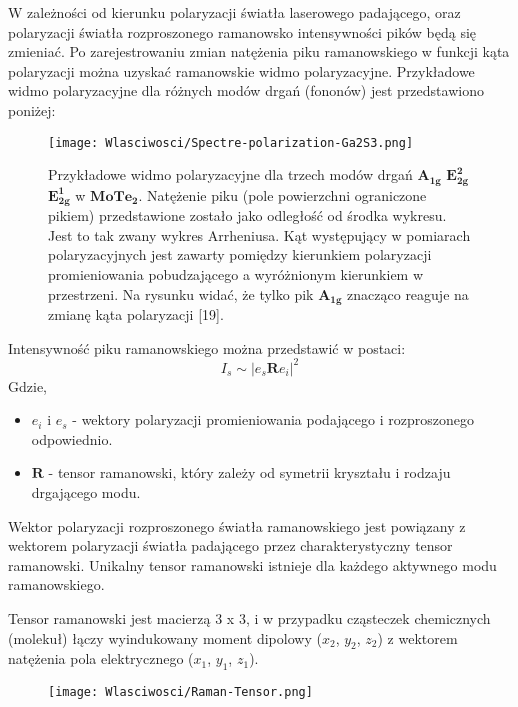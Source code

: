 W zależności od kierunku polaryzacji światła laserowego padającego, oraz polaryzacji światła rozproszonego ramanowsko intensywności pików będą się zmieniać. Po zarejestrowaniu zmian natężenia piku ramanowskiego w funkcji kąta polaryzacji można uzyskać ramanowskie widmo polaryzacyjne. Przykładowe widmo polaryzacyjne dla różnych modów drgań (fononów) jest przedstawiono poniżej:

\begin{figure}[H]
	\begin{center}
		\texttt{[image: Wlasciwosci/Spectre-polarization-Ga2S3.png]}
		\caption{Przykładowe widmo polaryzacyjne dla trzech modów drgań $\mathbf{A_{1g}}$ $\mathbf{E_{2g}^{2}}$ $\mathbf{E_{2g}^{1}}$ w $\mathbf{MoTe_{2}}$. Natężenie piku (pole powierzchni ograniczone pikiem) przedstawione zostało jako odległość od środka wykresu. Jest to tak zwany wykres Arrheniusa. Kąt występujący w pomiarach polaryzacyjnych jest zawarty pomiędzy kierunkiem polaryzacji promieniowania pobudzającego a wyróżnionym kierunkiem w przestrzeni. Na rysunku widać, że tylko pik $\mathbf{A_{1g}}$ znacząco reaguje na zmianę kąta polaryzacji [19].}
	\end{center}
\end{figure}

Intensywność piku ramanowskiego można przedstawić w postaci:
\begin{equation}
I_{s} \sim |e_{s}\mathbf{R}e_{i}|^{2}
\end{equation}
Gdzie,
\begin{itemize}
	\item $e_{i}$ i $e_{s}$ - wektory polaryzacji promieniowania podającego i rozproszonego odpowiednio.
	\item $\mathbf{R}$ - tensor ramanowski, który zależy od symetrii kryształu i rodzaju drgającego modu.
\end{itemize}

Wektor polaryzacji rozproszonego światła ramanowskiego jest powiązany z wektorem polaryzacji światła padającego przez charakterystyczny tensor ramanowski. Unikalny tensor ramanowski istnieje dla każdego aktywnego
modu ramanowskiego.

Tensor ramanowski jest macierzą 3 x 3, i w przypadku cząsteczek chemicznych (molekuł) łączy wyindukowany moment dipolowy ($x_{2}$, $y_{2}$, $z_{2}$) z wektorem natężenia pola elektrycznego ($x_{1}$, $y_{1}$, $z_{1}$).

\begin{figure}[H]
	\begin{center}
		\texttt{[image: Wlasciwosci/Raman-Tensor.png]}
	\end{center}
\end{figure}


